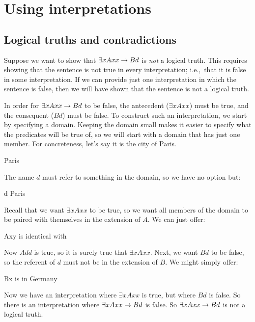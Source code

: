 \chapter{Using interpretations}
\label{sec.UsingModels}

\section{Logical truths and contradictions}
Suppose we want to show that $\exists xAxx \rightarrow Bd$ is \emph{not} a logical truth. This requires showing that the sentence is not true in every interpretation; i.e.,\ that it is false in some interpretation. If we can provide just one interpretation in which the sentence is false, then we will have shown that the sentence is not a logical truth.

In order for $\exists xAxx \rightarrow Bd$ to be false, the antecedent ($\exists x Axx$) must be true, and the consequent ($Bd$) must be false. To construct such an interpretation, we start by specifying a domain. Keeping the domain small makes it easier to specify what the predicates will be true of, so we will start with a domain that has just one member. For concreteness, let's say it is the city of Paris.
	\begin{ekey}
		\item[\text{domain}] Paris
	\end{ekey}
The name $d$ must refer to something in the domain, so we have no option but:
	\begin{ekey}
		\item[d] Paris
	\end{ekey}
Recall that we want $\exists x Axx$ to be true, so we want all members of the domain to be paired with themselves in the extension of $A$. We can just offer:
	\begin{ekey}
		\item[Axy]  is identical with 
	\end{ekey}
Now $Add$ is true, so it is surely true that $\exists x Axx$. Next, we want $Bd$ to be false, so the referent of $d$ must not be in the extension of $B$. We might simply offer:
	\begin{ekey}
		\item[Bx]  is in Germany
	\end{ekey}
Now we have an interpretation where $\exists x Axx$ is true, but where $Bd$ is false. So there is an interpretation where $\exists x Axx \rightarrow Bd$ is false. So $\exists x Axx \rightarrow Bd$ is not a logical truth.

